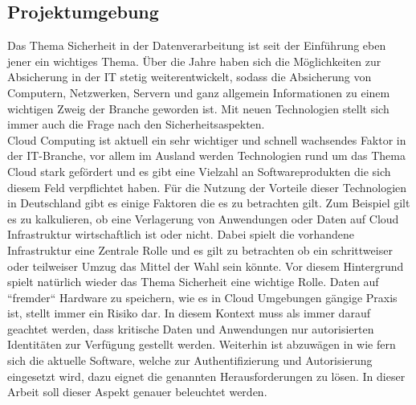 \documentclass[
book,
a4paper,   
titlepage,  
halfparskip,
12pt        
]{scrartcl}
\begin{document}
\begin{onehalfspacing}
\subsection{Projektumgebung}
Das Thema Sicherheit in der Datenverarbeitung ist seit der Einführung eben jener ein wichtiges Thema. Über die Jahre haben sich die Möglichkeiten zur Absicherung in der \ac{IT} stetig weiterentwickelt, sodass die Absicherung von Computern, Netzwerken, Servern und ganz allgemein Informationen zu einem wichtigen Zweig der Branche geworden ist. Mit neuen Technologien stellt sich immer auch die Frage nach den Sicherheitsaspekten.\\
Cloud Computing ist aktuell ein sehr wichtiger und schnell wachsendes Faktor in der \ac{IT}-Branche, vor allem im Ausland werden Technologien rund um das Thema Cloud stark gefördert und es gibt eine Vielzahl an Softwareprodukten die sich diesem Feld verpflichtet haben. Für die Nutzung der Vorteile dieser Technologien in Deutschland gibt es einige Faktoren die es zu betrachten gilt. Zum Beispiel gilt es zu kalkulieren, ob eine Verlagerung von Anwendungen oder Daten auf Cloud Infrastruktur wirtschaftlich ist oder nicht. Dabei spielt die vorhandene Infrastruktur eine Zentrale Rolle und es gilt zu betrachten ob ein schrittweiser oder teilweiser Umzug das Mittel der Wahl sein könnte. Vor diesem Hintergrund spielt natürlich wieder das Thema Sicherheit eine wichtige Rolle. Daten auf ``fremder`` Hardware zu speichern, wie es in Cloud Umgebungen gängige Praxis ist, stellt immer ein Risiko dar. In diesem Kontext muss als immer darauf geachtet werden, dass kritische Daten und Anwendungen nur autorisierten Identitäten zur Verfügung gestellt werden. Weiterhin ist abzuwägen in wie fern sich die aktuelle Software, welche zur Authentifizierung und Autorisierung eingesetzt wird, dazu eignet die genannten Herausforderungen zu lösen. In dieser Arbeit soll dieser Aspekt genauer beleuchtet werden.

\end{onehalfspacing}
\end{document}
